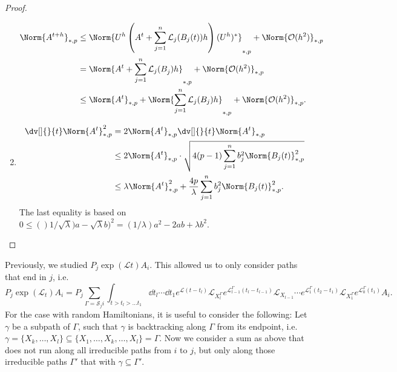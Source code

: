 \begin{proof}
\begin{enumerate}[1.]
      \begin{align*}
      \Norm{A^{t + h}}_{*,p} &\leq \Norm{U^{h} \left(A^{t }+ \sum_{j=1}^{n}\mathcal{L}_{j}(B_j(t))h\right)(U^{h})^{*}}_{*,p} + \Norm{\mathcal{O}(h^{2})}_{*,p} \\
                                    &= \Norm{A^{t}+ \sum_{j=1}^{n}\mathcal{L}_{j}(B_j^{})h}_{*,p} + \Norm{\mathcal{O}(h^{2})}_{*,p}  \\
                                    &\leq \Norm{A^{t}}_{*,p} + \Norm{\sum_{j=1}^{n} \mathcal{L}_j(B_j)h}_{*,p} + \Norm{\mathcal{O}(h^{2})}_{*,p} .
      \end{align*}
    \item 
      \begin{align*}
        \dv[]{}{t} \Norm{A^{t}}_{*,p}^{2} &= 2 \Norm{A^{t}}_{*,p} \dv[]{}{t} \Norm{A^{t}}_{*,p} \\
                                          &\leq 2 \Norm{A^{t}}_{*,p} \cdot \sqrt{4(p-1) \sum_{j=1}^{n} b_j^{2} \Norm{B_j(t)}^{2}_{*,p}} \\ 
                                          & \leq \lambda \Norm{A^{t}}_{*,p}^{2}+ \frac{4p}{\lambda} \sum_{j=1}^{n} b_j^{2} \Norm{B_j(t)}^{2}_{*,p}.
      \end{align*}
      The last equality is based on \(0\leq \left(\right)1/\sqrt{\lambda}) a- \sqrt{\lambda}b )^{2} = (1/\lambda) a^{2}-2ab +\lambda b^{2}\).
  \end{enumerate}
\end{proof}


\begin{remark}
    Previously, we studied \(P_j \exp(\mathcal{L}t) A_i\). This allowed us to only consider paths that end in \(j\), i.e.
    \[P_j \exp(\mathcal{L}_t)A_i = P_j \sum_{\Gamma =  \mathcal{S}_ji} \int_{t>t_l>\dots t_1} \dd{t_l}\cdots \dd{t_1}e^{\mathcal{L}(t-t_l)}\mathcal{L}_{X_l^{\Gamma }}e^{\mathcal{L}_{l-1}^{\Gamma }(t_l-t_{l-1})}\mathcal{L}_{X_{l-1}}\cdots e^{\mathcal{L}_1^{\Gamma }(t_2-t_1)} \mathcal{L}_{X_1^{\Gamma }}e^{\mathcal{L}_0^{\Gamma }(t_1)} A_i.\]
    For the case with random Hamiltonians, it is useful to consider the following: Let \(\gamma \) be a subpath of \(\Gamma \), such that \(\gamma \) is backtracking along \(\Gamma \) from its endpoint, i.e. \(\gamma =\{X_k,\dots,X_l\} \subseteq \{X_1,\dots, X_k,\dots,X_l\}= \Gamma \). Now we consider a sum as above that does not run along all irreducible paths from \(i\) to \(j\), but only along those irreducible paths \(\Gamma '\) that with \(\gamma\subseteq  \Gamma'\).
\end{remark}


